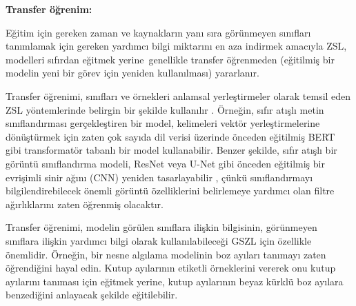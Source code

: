 \documentclass[10pt,a4paper]{report}
\begin{document}
	
		\textbf{Transfer öğrenim:}\newline
	
	Eğitim için gereken zaman ve kaynakların yanı sıra görünmeyen sınıfları tanımlamak için gereken yardımcı bilgi miktarını en aza indirmek amacıyla ZSL, modelleri sıfırdan eğitmek yerine  genellikle transfer öğrenmeden (eğitilmiş bir modelin yeni bir görev için yeniden kullanılması) yararlanır.\newline
	
	Transfer öğrenimi, sınıfları ve örnekleri anlamsal yerleştirmeler olarak temsil eden ZSL yöntemlerinde belirgin bir şekilde kullanılır . Örneğin, sıfır atışlı metin sınıflandırması gerçekleştiren bir model, kelimeleri vektör yerleştirmelerine dönüştürmek için zaten çok sayıda dil verisi üzerinde önceden eğitilmiş BERT gibi transformatör tabanlı bir model kullanabilir. Benzer şekilde, sıfır atışlı bir görüntü sınıflandırma modeli, ResNet veya U-Net gibi önceden eğitilmiş bir evrişimli sinir ağını (CNN) yeniden tasarlayabilir , çünkü sınıflandırmayı bilgilendirebilecek önemli görüntü özelliklerini belirlemeye yardımcı olan filtre ağırlıklarını zaten öğrenmiş olacaktır.\newline
	
	Transfer öğrenimi, modelin görülen sınıflara ilişkin bilgisinin, görünmeyen sınıflara ilişkin yardımcı bilgi olarak kullanılabileceği GSZL için özellikle önemlidir. Örneğin, bir nesne algılama modelinin boz ayıları tanımayı zaten öğrendiğini hayal edin. Kutup ayılarının etiketli örneklerini vererek onu kutup ayılarını tanıması için eğitmek yerine, kutup ayılarının beyaz kürklü boz ayılara benzediğini anlayacak şekilde eğitilebilir\cite{bergmann2024zero}.
	
\end{document}
